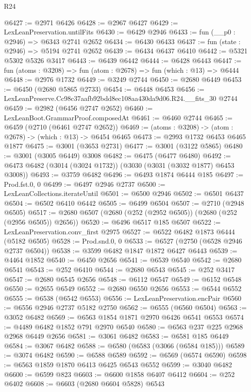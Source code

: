 \begin{lexlean}{R24}
\begin{coremodule}
@6427 := @2971 @6426
@6428 := @2967 @6427
@6429 := LexLeanPreservation.untilFits
@6430 := @6429 @2946
@6433 := fun (__p0 : @2946) => @6343 @2741 @2652
@6434 := @6430 @6433
@6437 := fun (state : @2946) => @5194 @2741 @2652
@6439 := @6434 @6437 @6410
@6442 := @5321 @5302 @5326 @3417
@6443 := @6439 @6442
@6444 := @6428 @6443
@6447 := fun (atoms : @3208) => fun (atom : @2678) => fun (which : @13) => @6444
@6448 := @2976 @1732
@6449 := @3249 @2744
@6450 := @2680 @6449
@6453 := @6450 (@2680 @5865 @2733)
@6454 := @6448 @6453
@6456 := LexLeanPreserve.Cc98c37aafb92bdd8ec108aa430da9d06.R24.__fits_30 @2744
@6459 := @2982 (@6456 @2747 @2652)
@6460 := LexLeanBoot.GrammarProof.composedAt
@6461 := @6460 @2744
@6465 := @6459 (@2710 (@6461 @2747 @2652))
@6469 := (atoms : @3208) -> (atom : @2678) -> (which : @13) -> @6454 @6465
@6473 := @2993 @1732 @6453 @6465 @1877
@6475 := @3001 (@3653 @2731)
@6477 := @3001 (@3122 @5865)
@6480 := @3001 (@3005 @6449) @3008
@6482 := @6475 (@6477 @6480)
@6492 := @6473 @6482 (@3014 (@3024 @1732)) (@3030 (@3031 (@3032 @1877) @6453 @3008))
@6493 := @3759 @6482
@6496 := @6493 @1874 @6444 @185
@6497 := Prod.fst.{0, 0}
@6499 := @6497 @2946 @2737
@6500 := LexLeanCollections.iterateUntil
@6501 := @6500 @2946
@6502 := @6501 @6437
@6504 := @6502 @6410 @6442
@6505 := @6499 @6504
@6507 := @2710 (@2948 @6505)
@6517 := @2680 @6507 (@2680 (@252 (@2952 @6505)) (@2680 (@252 (@2956 @6505)) @2656))
@6520 := @6496 @6517 @185 @6507
@6522 := LexLeanPreservation.conv_first @2975
@6527 := @6522 @6482 @1873 @6444 (@5182 @6505)
@6528 := Prod.snd.{0, 0}
@6533 := @6527 (@2750 (@6528 @2946 @2737 @6504))
@6538 := @3599 @6482 @1847 @1872 @6427 @6443
@6539 := @4464 @1852
@6540 := @6450 @2656
@6541 := @6539 @6540
@6542 := @2680 @6541
@6543 := @252 @6410
@6544 := @2680 @6543
@6545 := @252 @3417
@6547 := @2680 @6545 @2656
@6548 := @6112 @6547
@6549 := @6152 @6548
@6550 := @2655 @6549
@6552 := @2680 @6550 @2656
@6553 := @6544 @6552
@6555 := @6538 (@6542 @6553)
@6556 := LexLeanPreservation.encPair
@6560 := @6556 @2946 @2737 @5182 @2750
@6562 := @6555 (@6560 @6504)
@6563 := @3052 @6482
@6569 := @6563 @1854 @1871 @2970 @6426 @6541 @6553
@6574 := @4489 @6482 @1852 @791 @2970 @6540
@6580 := @6563 @237 @225 @2968 @2968 @6449 @2656
@6581 := @3061 @6482
@6583 := @6581 @185 @6449
@6584 := @3067 @6482
@6588 := @6580 (@6583 (@3066 (@6584 @185)))
@6589 := @3074 @6482
@6590 := @6588 @6589
@6592 := @6569 (@6574 @6590)
@6598 := @6563 @1859 @1870 @6413 @6425 @6543 @6552
@6599 := @3040 @6482
@6600 := @6599 @823
@6603 := @6600 @1858 @6407 @6412
@6604 := @252 @6402
@6608 := @6603 (@2680 @6604 @5828) @6543

\end{coremodule}
\end{lexlean}
